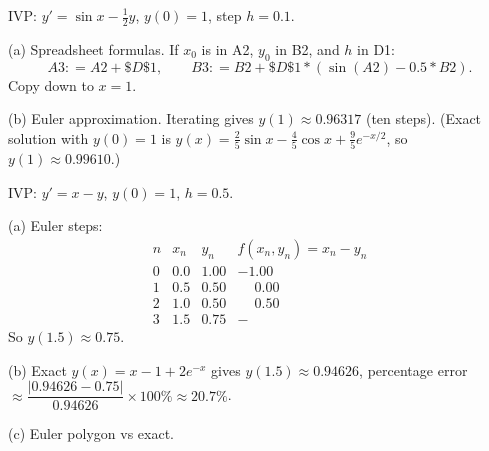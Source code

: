 \documentclass[11pt]{article}
\def\textbf#1{#1}%
\def\texttt#1{#1}%
\def\mathbf#1{#1}%
\begin{document}
\begin{solution}
IVP: $y'=\sin x-\tfrac12 y$, $y(0)=1$, step $h=0.1$.

\textbf{(a) Spreadsheet formulas.}
If $x_0$ is in \texttt{A2}, $y_0$ in \texttt{B2}, and $h$ in \texttt{D1}:
\[
\texttt{A3: }=A2+\$D\$1,\qquad
\texttt{B3: }=B2+\$D\$1*(\sin(A2)-0.5*B2).
\]
Copy down to $x=1$.

\textbf{(b) Euler approximation.}
Iterating gives $y(1)\approx \boxed{0.96317}$ (ten steps).
(Exact solution with $y(0)=1$ is $y(x)=\tfrac{2}{5}\sin x-\tfrac{4}{5}\cos x+\tfrac{9}{5}e^{-x/2}$,
so $y(1)\approx 0.99610$.)
\end{solution}

\begin{solution}
IVP: $y'=x-y$, $y(0)=1$, $h=0.5$.

\textbf{(a)} Euler steps:
\[
\begin{array}{c|c|c|c}
n&x_n&y_n&f(x_n,y_n)=x_n-y_n\\\hline
0&0.0&1.00&-1.00\\
1&0.5&0.50&\phantom{-}0.00\\
2&1.0&0.50&\phantom{-}0.50\\
3&1.5&\mathbf{0.75}&-
\end{array}
\]
So $y(1.5)\approx \boxed{0.75}$.

\textbf{(b)} Exact $y(x)=x-1+2e^{-x}$ gives $y(1.5)\approx 0.94626$,
percentage error $\approx \dfrac{|0.94626-0.75|}{0.94626}\times100\%\approx \boxed{20.7\%}$.

\textbf{(c) Euler polygon vs exact.}
\begin{center}
\end{center}
\end{solution}
\end{document}
